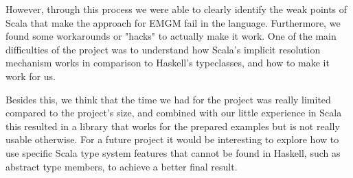 \documentclass[a4paper]{article}
\begin{document}
However, through this process we were able to clearly identify the weak points of Scala that make the approach for EMGM fail in the language. Furthermore, we found some workarounds or "hacks" to actually make it work. One of the main difficulties of the project was to understand how Scala's implicit resolution mechanism works in comparison to Haskell's typeclasses, and how to make it work for us.

Besides this, we think that the time we had for the project was really limited compared to the project's size, and combined with our little experience in Scala this resulted in a library that works for the prepared examples but is not really usable otherwise. For a future project it would be interesting to explore how to use specific Scala type system features that cannot be found in Haskell, such as abstract type members, to achieve a better final result.



\end{document}
